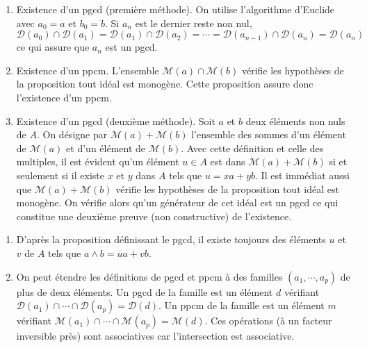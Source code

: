 \begin{demo}
 \begin{enumerate}
  \item Existence d'un pgcd (première méthode).\newline
On utilise l'algorithme d'Euclide avec $a_0=a$ et $b_0=b$. Si $a_n$ est le dernier reste non nul,
\begin{displaymath}
 \mathcal D(a_0) \cap\mathcal D(a_1)= \mathcal D(a_1) \cap\mathcal D(a_2)=\cdots = \mathcal D(a_{n-1}) \cap\mathcal D(a_n)=\mathcal D(a_n)
\end{displaymath}
ce qui assure que $a_n$ est un pgcd.
  \item Existence d'un ppcm.\newline
L'ensemble $\mathcal M (a)\cap \mathcal M (b)$ vérifie les hypothèses de la proposition \og tout idéal est monogène\fg. Cette proposition assure donc l'existence d'un ppcm.
 \item Existence d'un pgcd (deuxième méthode).\newline
 Soit $a$ et $b$ deux éléments non nuls de $A$. On désigne par $\mathcal M (a) + \mathcal M (b)$ l'ensemble des sommes d'un élément de $\mathcal M (a)$ et d'un élément de $\mathcal M (b)$. 
 Avec cette définition et celle des multiples, il est évident qu'un élément  $u\in A$ est dans $\mathcal M (a) + \mathcal M (b)$ si et seulement si il existe $x$ et $y$ dans $A$ tels que $u=xa+yb$. Il est immédiat aussi que $\mathcal M (a) + \mathcal M (b)$ vérifie les hypothèses de la proposition \og tout idéal est monogène\fg. On vérifie alors qu'un générateur de cet idéal est un pgcd ce qui constitue une deuxième preuve (non constructive) de l'existence.
 \end{enumerate}
\end{demo}
\begin{rems}
\begin{enumerate}
 \item D'après la proposition définissant le pgcd, il existe toujours des éléments $u$ et $v$ de $A$ tels que  $a\wedge b=ua +v b$.
 \item On peut étendre les définitions de pgcd et ppcm à des familles $(a_1,\cdots,a_p)$ de plus de deux éléments. Un pgcd de la famille est un élément $d$ vérifiant $\mathcal D(a_1)\cap\cdots \cap\mathcal D(a_p)=\mathcal D(d)$. Un ppcm de la famille est un élément $m$ vérifiant $\mathcal M(a_1)\cap\cdots \cap\mathcal M(a_p)=\mathcal M(d)$. Ces opérations (à un facteur inversible près) sont associatives car l'intersection est associative.
\end{enumerate}
 \end{rems}
